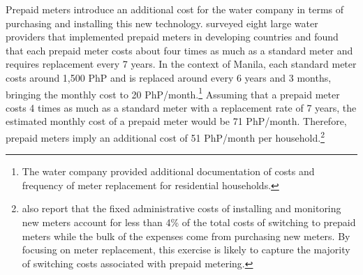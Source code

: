 \documentclass[12pt]{article}
\begin{document}

Prepaid meters introduce an additional cost for the water company in terms of purchasing and installing this new technology.  \cite{heymans2014limits} surveyed eight large water providers that implemented prepaid meters in developing countries and found that each prepaid meter costs about four times as much as a standard meter and requires replacement every 7 years.  In the context of Manila, each standard meter costs around 1,500 PhP and is replaced around every 6 years and 3 months, bringing the monthly cost to 20 PhP/month.\footnote{The water company provided additional documentation of costs and frequency of meter replacement for residential households.}  Assuming that a prepaid meter costs 4 times as much as a standard meter with a replacement rate of 7 years, the estimated monthly cost of a prepaid meter would be 71 PhP/month.  Therefore, prepaid meters imply an additional cost of 51 PhP/month per household.\footnote{\cite{heymans2014limits} also report that the fixed administrative costs of installing and monitoring new meters account for less than 4\% of the total costs of switching to prepaid meters while the bulk of the expenses come from purchasing new meters.  By focusing on meter replacement, this exercise is likely to capture the majority of switching costs associated with prepaid metering.}  






\end{document}
